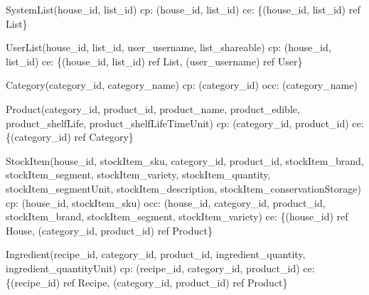 {\begin{description}
		\item SystemList(house\_id, list\_id)
		\newline
		\acrshort{cp}: (house\_id, list\_id) \newline
		\acrshort{ce}: \{(house\_id, list\_id) ref List\}
		
		\item UserList(house\_id, list\_id, user\_username, list\_shareable)
		\newline
		\acrshort{cp}: (house\_id, list\_id) \newline
		\acrshort{ce}: \{(house\_id, list\_id) ref List, (user\_username) ref User\}
		
		\item Category(category\_id, category\_name)
		\newline
		\acrshort{cp}: (category\_id) \newline
		\acrshort{occ}: (category\_name)
		
		\item Product(category\_id, product\_id, product\_name, product\_edible, product\_shelfLife, \newline product\_shelfLifeTimeUnit) \newline
		\acrshort{cp}: (category\_id, product\_id) \newline
		\acrshort{ce}: \{(category\_id) ref Category\}
		
		\item StockItem(house\_id, stockItem\_sku, category\_id, product\_id, stockItem\_brand, stockItem\_segment, stockItem\_variety, stockItem\_quantity, stockItem\_segmentUnit, stockItem\_description, stockItem\_conservationStorage) \newline
		\acrshort{cp}: (house\_id, stockItem\_sku) \newline
		\acrshort{occ}: (house\_id, category\_id, product\_id, stockItem\_brand, stockItem\_segment, \newline stockItem\_variety) \newline
		\acrshort{ce}: \{(house\_id) ref House, (category\_id, product\_id) ref Product\}
		
		\item Ingredient(recipe\_id, category\_id, product\_id, ingredient\_quantity, ingredient\_quantityUnit) \newline
		\acrshort{cp}: (recipe\_id, category\_id, product\_id) \newline
		\acrshort{ce}: \{(recipe\_id) ref Recipe, (category\_id, product\_id) ref Product\}
		

\end{description}}
